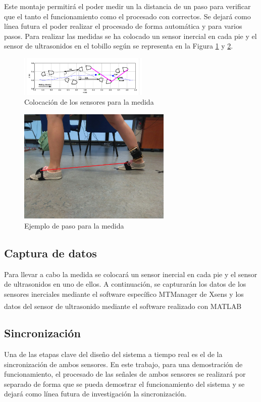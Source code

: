 Este montaje permitirá el poder medir un la distancia de un paso para verificar que el tanto el funcionamiento como el procesado con correctos. Se dejará como línea futura el poder realizar el procesado de forma automática y para varios pasos. Para realizar las medidas se ha colocado un sensor inercial en cada pie y el sensor de ultrasonidos en el tobillo según se representa en la Figura \ref{fig:colocar} y \ref{fig:paso}. 
\begin{figure}[H]
	\centering
	\includegraphics[width=0.55\textwidth]{./graphics/Medida}
	\caption{Colocación de los sensores para la medida} \label{fig:colocar}
\end{figure}
\begin{figure}[H]
	\centering
	\includegraphics[width=0.65\textwidth]{./graphics/paso}
	\caption{Ejemplo de paso para la medida} \label{fig:paso}
\end{figure}


\subsection{Captura de datos}

Para llevar a cabo la medida se colocará un sensor inercial en cada pie y el sensor de ultrasonidos en uno de ellos. A continuación, se capturarán los datos de los sensores inerciales mediante el software específico MTManager de Xsens y los datos del sensor de ultrasonido mediante el software realizado con MATLAB\textsuperscript{\textregistered} 


\subsection{Sincronización}
Una de las etapas clave del diseño del sistema a tiempo real es el de la sincronización de ambos sensores. En este trabajo, para una demostración de funcionamiento, el procesado de las señales de ambos sensores se realizará por separado de forma que se pueda demostrar el funcionamiento del sistema y se dejará como línea futura de investigación la sincronización. 

